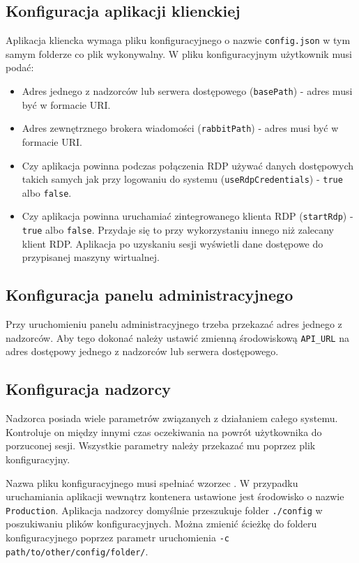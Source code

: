 \documentclass[../opis-rozwiazania.tex]{subfiles}
\begin{document}
\subsection{Konfiguracja aplikacji klienckiej}
Aplikacja kliencka wymaga pliku konfiguracyjnego o nazwie \texttt{config.json} w tym samym folderze co plik wykonywalny.
W pliku konfiguracyjnym użytkownik musi podać:
\begin{itemize}
	\item Adres jednego z nadzorców lub serwera dostępowego (\texttt{basePath}) - adres musi być w formacie URI.
	\item Adres zewnętrznego brokera wiadomości (\texttt{rabbitPath}) - adres musi być w formacie URI.
	\item Czy aplikacja powinna podczas połączenia RDP używać danych dostępowych takich samych jak przy logowaniu do systemu (\texttt{useRdpCredentials}) - \texttt{true} albo \texttt{false}.
	\item Czy aplikacja powinna uruchamiać zintegrowanego klienta RDP (\texttt{startRdp}) - \texttt{true} albo \texttt{false}. Przydaje się to przy wykorzystaniu innego niż zalecany klient RDP. Aplikacja po uzyskaniu sesji wyświetli dane dostępowe do przypisanej maszyny wirtualnej.
\end{itemize}

\subsection{Konfiguracja panelu administracyjnego}
\label{system_startup.admin_panel_conf}
Przy uruchomieniu panelu administracyjnego trzeba przekazać adres jednego z nadzorców.
Aby tego dokonać należy ustawić zmienną środowiskową \texttt{API\_URL} na adres dostępowy jednego z nadzorców lub serwera dostępowego.

\subsection{Konfiguracja nadzorcy}
\label{system_startup.overseer_conf}
Nadzorca posiada wiele parametrów związanych z działaniem całego systemu.
Kontroluje on między innymi czas oczekiwania na powrót użytkownika do porzuconej sesji.
Wszystkie parametry należy przekazać mu poprzez plik konfiguracyjny.

Nazwa pliku konfiguracyjnego musi spełniać wzorzec \texttt{}.
W przypadku uruchamiania aplikacji wewnątrz kontenera ustawione jest środowisko o nazwie \texttt{Production}.
Aplikacja nadzorcy domyślnie przeszukuje folder \texttt{./config} w poszukiwaniu plików konfiguracyjnych.
Można zmienić ścieżkę do folderu konfiguracyjnego poprzez parametr uruchomienia \texttt{-c path/to/other/config/folder/}.
\end{document}
